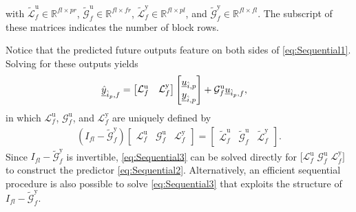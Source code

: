 with ${\widetilde{\mathcal{L}}^\mathrm{u}_f\in\mathbb{R}^{fl\times pr}}$, ${\widetilde{\mathcal{G}}^\mathrm{u}_f\in\mathbb{R}^{fl\times fr}}$, ${\widetilde{\mathcal{L}}^\mathrm{y}_f\in\mathbb{R}^{fl\times pl}}$, and ${\widetilde{\mathcal{G}}^\mathrm{y}_f\in\mathbb{R}^{fl\times fl}}$. The subscript of these matrices indicates the number of block rows.

Notice that the predicted future outputs feature on both sides of \eqref{eq:Sequential1}. Solving for these outputs yields
\begin{align}\label{eq:Sequential2}
    \underline{\hat{y}}_{\hat{i}_p,f} &=
    \begin{bmatrix}
        \mathcal{L}^\mathrm{u}_f & \mathcal{L}^\mathrm{y}_f 
    \end{bmatrix}    
    \begin{bmatrix}
        \underline{u}_{\hat{i},p}\\
        \underline{y}_{\hat{i},p}
    \end{bmatrix}+
    \mathcal{G}^\mathrm{u}_f
    \underline{u}_{\hat{i}_p,f},
\end{align}%
in which $\mathcal{L}^\mathrm{u}_f$, $\mathcal{G}^\mathrm{u}_f$, and $\mathcal{L}^\mathrm{y}_f$ are uniquely defined by
\begin{align}\label{eq:Sequential3}
    \left(I_{fl}-\widetilde{\mathcal{G}}^\mathrm{y}_f\right)
    \begin{bmatrix}
        \mathcal{L}^\mathrm{u}_f & \mathcal{G}^\mathrm{u}_f & \mathcal{L}^\mathrm{y}_f
    \end{bmatrix}=
    \begin{bmatrix}
        \widetilde{\mathcal{L}}^\mathrm{u}_f & \widetilde{\mathcal{G}}^\mathrm{u}_f & \widetilde{\mathcal{L}}^\mathrm{y}_f
    \end{bmatrix}.
\end{align}
Since $I_{fl}-\widetilde{\mathcal{G}}^\mathrm{y}_f$ is invertible, \eqref{eq:Sequential3} can be solved directly for $\big[\mathcal{L}^\mathrm{u}_f \; \mathcal{G}^\mathrm{u}_f \; \mathcal{L}^\mathrm{y}_f\big]$ to construct the predictor \eqref{eq:Sequential2}. Alternatively, an efficient sequential procedure is also possible to solve \eqref{eq:Sequential3} that exploits the structure of $I_{fl}-\widetilde{\mathcal{G}}^\mathrm{y}_f$.

